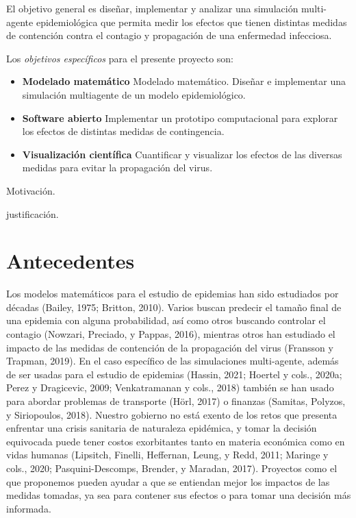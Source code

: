 \documentclass{sciposter}
\begin{document}
El objetivo general es diseñar, implementar y analizar una simulación multi-agente epidemiológica que permita medir los efectos que tienen distintas medidas de contención contra el contagio y propagación de una enfermedad infecciosa.\par
Los \emph{objetivos específicos} para el presente proyecto son:\par
\begin{itemize}
  \item \textbf{Modelado matemático} Modelado matemático. Diseñar e implementar una simulación multiagente de un modelo epidemiológico.
  \item \textbf{Software abierto} Implementar un prototipo computacional para explorar los efectos de distintas medidas de contingencia.
  \item \textbf{Visualización científica} Cuantificar y visualizar los efectos de las diversas medidas para evitar la propagación del virus.
\end{itemize}

Motivación.

justificación. 

\section{Antecedentes}
Los modelos matemáticos para el estudio de epidemias han sido estudiados por décadas (Bailey, 1975; Britton, 2010). Varios buscan predecir el tamaño final de una epidemia con alguna probabilidad, así como otros buscando controlar el contagio (Nowzari, Preciado, y Pappas, 2016), mientras otros han estudiado el impacto de las medidas de contención de la
propagación del virus (Fransson y Trapman, 2019). En el caso específico de las simulaciones multi-agente, además de ser usadas para el estudio de epidemias (Hassin, 2021; Hoertel y cols., 2020a; Perez y Dragicevic, 2009; Venkatramanan y cols., 2018) también se han usado para abordar problemas de transporte (Hörl, 2017) o finanzas (Samitas, Polyzos, y Siriopoulos, 2018). Nuestro gobierno no está exento de los retos que presenta enfrentar una crisis sanitaria de naturaleza epidémica, y tomar la decisión equivocada puede tener costos exorbitantes tanto en materia económica como en vidas humanas (Lipsitch, Finelli, Heffernan, Leung, y Redd, 2011; Maringe y cols., 2020; Pasquini-Descomps, Brender, y Maradan, 2017). Proyectos como el que proponemos pueden ayudar a que se entiendan mejor los impactos de las medidas tomadas, ya sea para contener sus efectos o para tomar una decisión más informada.
\end{document}
